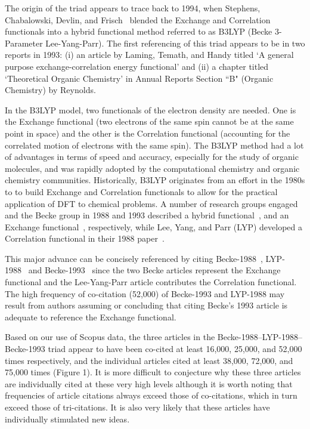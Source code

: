 \documentclass[11pt, oneside]{article}   	%
\begin{document}
The origin of the triad appears to trace back to 1994, when Stephens, Chabalowski, Devlin, and Frisch~\citep{stephens1994ab} blended the Exchange and Correlation functionals into a hybrid functional method referred to as B3LYP (Becke 3-Parameter Lee-Yang-Parr). The first referencing of this triad appears to be in two reports in 1993: (i) an article by Laming, Temath, and Handy\citep{laming1993} titled `A general purpose exchange‐correlation energy functional' and (ii) a chapter titled `Theoretical Organic Chemistry' in Annual Reports Section ``B" (Organic Chemistry) by Reynolds\citep{reynolds1993theoretical}.

In the B3LYP model, two functionals of the electron density are needed. One is the Exchange functional (two electrons of the same spin cannot be at the same point in space) and the other is the Correlation functional (accounting for the correlated motion of electrons with the same spin). The B3LYP method had a lot of advantages in terms of speed and accuracy, especially for the study of organic molecules, and was rapidly adopted by the computational chemistry and organic chemistry communities. Historically, B3LYP originates from an effort in the 1980s to to build Exchange and Correlation functionals to allow for the practical application of DFT to chemical problems. A number of research groups engaged and the Becke group in 1988 and 1993 described a hybrid functional~\citep{becke1988density}, and an Exchange functional~\citep{becke1993dft}, respectively, while Lee, Yang, and Parr (LYP) developed a Correlation functional in their 1988 paper~\citep{lyp1988}.  

This major advance can be concisely referenced by citing Becke-1988~\citep{becke1988density}, LYP-1988~\citep{lyp1988} and Becke-1993~\citep{becke1993dft} since the two Becke articles represent the Exchange functional and the Lee-Yang-Parr article contributes the Correlation functional. The high frequency of co-citation (52,000) of Becke-1993 and LYP-1988 may result from authors assuming or concluding that citing Becke's 1993 article is adequate to reference the Exchange functional. 

Based on our use of Scopus data, the three articles in the Becke-1988--LYP-1988--Becke-1993 triad appear to have been co-cited at least 16,000, 25,000, and 52,000 times respectively, and the individual articles cited at least 38,000, 72,000, and 75,000 times (Figure 1). It is more difficult to conjecture why these three articles are individually cited at these very high levels although it is worth noting that  frequencies of article citations always exceed those of co-citations, which in turn exceed those of tri-citations. It is also very likely that these articles have individually stimulated new ideas.
\end{document}

